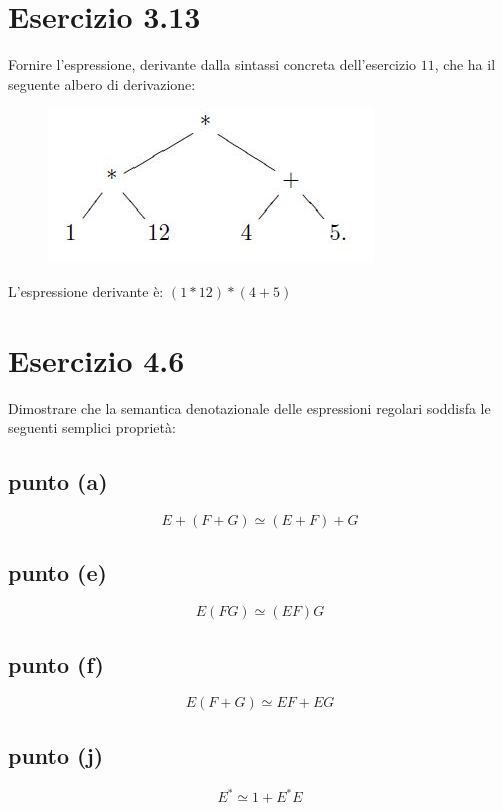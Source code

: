 	\section{Esercizio 3.13}
		\qquad Fornire l'espressione, derivante dalla sintassi concreta
		dell'esercizio $11$, che ha il seguente albero di derivazione:
		
		\begin{figure}[h]
			\centering
			\includegraphics[scale=0.5]{img/3-13}
		\end{figure}
		
		\sectionline
		
		\qquad L'espressione derivante \`e: $(1*12)*(4+5)$
		
		\newpage
	
	\newpage \section{Esercizio 4.6}
		\qquad Dimostrare che la semantica denotazionale delle espressioni regolari
		soddisfa le seguenti semplici propriet\`a:
		\subsection{punto (a)}
			$$E+(F+G) \simeq (E+F)+G$$
		\subsection{punto (e)}
			$$E(FG) \simeq (EF)G$$
		\subsection{punto (f)}
			$$E(F+G) \simeq EF+EG$$
		\subsection{punto (j)}
			$$E^* \simeq 1+E^*E$$
			
		\sectionline
		
